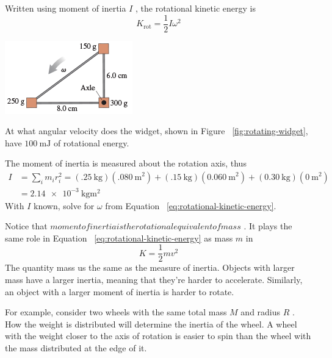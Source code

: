Written using moment of inertia
$
    I
$%
, the rotational kinetic energy is
\begin{equation}
    \label{eq:rotational-kinetic-energy} K_\mathrm{rot} = \frac{1}{2}I\omega^2
\end{equation}

\begin{Exercise}[title={A rotating widget}]
    \begin{center}
        \includegraphics[totalheight=0.2\textheight]{../figures/rotating-widget.png}
        \label{fig:rotating-widget}
    \end{center}
    At what angular velocity does the widget, shown in Figure~%
    \ref{fig:rotating-widget}, have
    $
        \qty{100}{\milli\joule}
    $ of rotational energy.
\end{Exercise}
\begin{Answer}
    The moment of inertia is measured about the rotation axis, thus
    \begin{align}
        I &= \sum_i m_ir_i^2 = (\qty{.25}{\kilo\gram})(\qty{.080}{\metre}^2)
        + (\qty{.15}{\kilo\gram})(\qty{0.060}{\metre}^2) + (\qty{0.30}{\kilo\gram})
        (\qty{0}{\metre}^2) \\
        &= \qty{2.14e-3}{\kilo\gram\square\metre}
    \end{align}
    With
    $
        I
    $ known, solve for
    $
        \omega
    $ from Equation~%
    \ref{eq:rotational-kinetic-energy}.
\end{Answer}

Notice that
$
    moment of inertia is the rotational equivalent of mass
$%
.  It plays the same role in Equation~%
\ref{eq:rotational-kinetic-energy} as mass
$
    m
$ in
\begin{equation}
    K = \frac{1}{2}mv^2
\end{equation}
The quantity mass us the same as the measure of inertia.  Objects with
larger mass have a larger inertia, meaning that they're harder to
accelerate.  Similarly, an object with a larger moment of inertia is
harder to rotate.

For example, consider two wheels with the same total mass
$
    M
$ and radius
$
    R
$%
.  How the weight is distributed will determine the inertia of the
wheel.  A wheel with the weight closer to the axis of rotation is easier
to spin than the wheel with the mass distributed at the edge of it.

